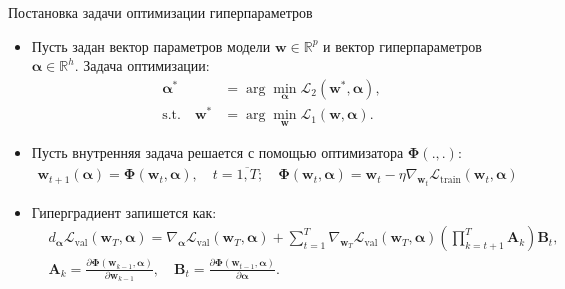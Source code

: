 \documentclass[aspectratio=169]{beamer}
\def\ltrn{\mathcal{L}_{\mathrm{train}}}
\newcommand{\vect}[1]{\boldsymbol{\mathbf{#1}}}
\begin{document}
\begin{frame}{Постановка задачи оптимизации гиперпараметров}
\begin{itemize}
  \item Пусть задан вектор параметров модели $\mathbf{w} \in \mathbb{R}^p$ и вектор гиперпараметров
  $\boldsymbol{\alpha} \in \mathbb{R}^h$. Задача оптимизации:
  \begin{align*}
    \boldsymbol{\alpha}^* &= \arg\min_{\boldsymbol{\alpha}}\mathcal{L}_2(\mathbf{w}^*, \boldsymbol{\alpha}), \\
    \mathrm{s.t.} \quad \mathbf{w}^* &= \arg\min_{\mathbf{w}}\mathcal{L}_1(\mathbf{w}, \boldsymbol{\alpha}).
  \end{align*}
  \item Пусть внутренняя задача решается с помощью оптимизатора $\mathbf{\Phi}(., .)$:
  \begin{align*}
    \mathbf{w}_{t + 1}(\boldsymbol{\alpha}) = \mathbf{\Phi}(\mathbf{w}_t, \boldsymbol{\alpha}), \quad
    t = \overline{1, T}; \quad \vect{\Phi}(\vect{w}_{t}, \vect{\alpha}) = \vect{w}_t - \eta\nabla_{\vect{w}_t}\ltrn(\vect{w}_t, \vect{\alpha})
  \end{align*}
  \item Гиперградиент запишется как:
  \begin{align*}
    &d_{\vect{\alpha}}\mathcal{L}_\text{val}(\vect{w}_T, \vect{\alpha}) = \nabla_{\vect{\alpha}}\mathcal{L}_\text{val}(\vect{w}_T, \vect{\alpha}) + \sum_{t=1}^T \nabla_{\vect{w}_T}\mathcal{L}_\text{val}(\vect{w}_T, \vect{\alpha})\left(\prod_{k=t+1}^T\vect{A}_k\right)\vect{B}_t, \\
    &\vect{A}_k = \frac{\partial\vect{\Phi}(\vect{w}_{k-1}, \vect{\alpha})}{\partial\vect{w}_{k-1}}, \quad \vect{B}_t = \frac{\partial\vect{\Phi}(\vect{w}_{t-1}, \vect{\alpha})}{\partial\vect{\alpha}}.
\end{align*}
\end{itemize}
\end{frame}
\end{document}
